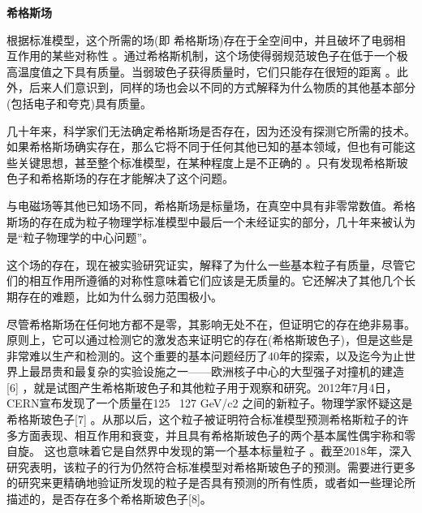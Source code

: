 \textbf{希格斯场}

根据标准模型，这个所需的场(即 希格斯场)存在于全空间中，并且破坏了电弱相互作用的某些对称性 。通过希格斯机制，这个场使得弱规范玻色子在低于一个极高温度值之下具有质量。当弱玻色子获得质量时，它们只能存在很短的距离 。此外，后来人们意识到，同样的场也会以不同的方式解释为什么物质的其他基本部分(包括电子和夸克)具有质量。

几十年来，科学家们无法确定希格斯场是否存在，因为还没有探测它所需的技术。如果希格斯场确实存在，那么它将不同于任何其他已知的基本领域，但也有可能这些关键思想，甚至整个标准模型，在某种程度上是不正确的 。只有发现希格斯玻色子和希格斯场的存在才能解决了这个问题。

与电磁场等其他已知场不同，希格斯场是标量场，在真空中具有非零常数值。希格斯场的存在成为粒子物理学标准模型中最后一个未经证实的部分，几十年来被认为是“粒子物理学的中心问题”。

这个场的存在，现在被实验研究证实，解释了为什么一些基本粒子有质量，尽管它们的相互作用所遵循的对称性意味着它们应该是无质量的。它还解决了其他几个长期存在的难题，比如为什么弱力范围极小。

尽管希格斯场在任何地方都不是零，其影响无处不在，但证明它的存在绝非易事。原则上，它可以通过检测它的激发态来证明它的存在(希格斯玻色子)，但是这些是非常难以生产和检测的。这个重要的基本问题经历了40年的探索，以及迄今为止世界上最昂贵和最复杂的实验设施之一——欧洲核子中心的大型强子对撞机的建造[6] ，就是试图产生希格斯玻色子和其他粒子用于观察和研究。2012年7月4日，CERN宣布发现了一个质量在125~ 127 GeV/c2 之间的新粒子。物理学家怀疑这是希格斯玻色子[7] 。从那以后，这个粒子被证明符合标准模型预测希格斯粒子的许多方面表现、相互作用和衰变，并且具有希格斯玻色子的两个基本属性偶宇称和零自旋。 这也意味着它是自然界中发现的第一个基本标量粒子 。截至2018年，深入研究表明，该粒子的行为仍然符合标准模型对希格斯玻色子的预测。需要进行更多的研究来更精确地验证所发现的粒子是否具有预测的所有性质，或者如一些理论所描述的，是否存在多个希格斯玻色子[8]。